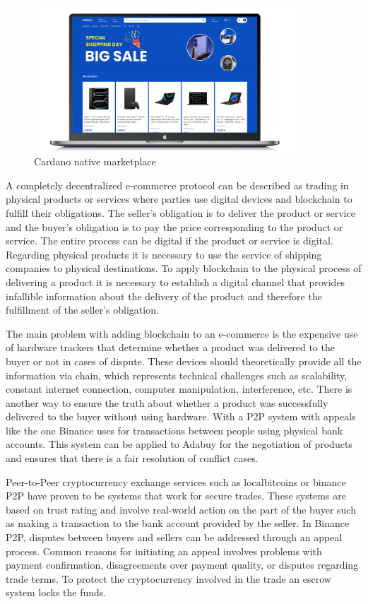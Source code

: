 \documentclass[12pt]{article}
\begin{document}
\begin{figure}[ht]
  \centering
  \includegraphics[width=0.88\textwidth, keepaspectratio]{adabuy.png}
  \caption{Cardano native marketplace}
  \label{fig:web}
\end{figure}

A completely decentralized e-commerce protocol can be described as trading in physical products or services where parties use digital devices and blockchain to fulfill their obligations.
The seller's obligation is to deliver the product or service and the buyer's obligation is to pay the price corresponding to the product or service. 
The entire process can be digital if the product or service is digital.
Regarding physical products it is necessary to use the service of shipping companies to physical destinations.
To apply blockchain to the physical process of delivering a product it is necessary to establish a digital channel that provides infallible information about the delivery of the product and therefore the fulfillment of the seller's obligation. 

The main problem with adding blockchain to an e-commerce is the expensive use of hardware trackers that determine whether a product was delivered to the buyer or not in cases of dispute. These devices should theoretically provide all the information via chain, which represents technical challenges such as scalability, constant internet connection, computer manipulation, interference, etc. There is another way to ensure the truth about whether a product was successfully delivered to the buyer without using hardware. With a P2P system with appeals like the one Binance uses for transactions between people using physical bank accounts. This system can be applied to Adabuy for the negotiation of products and ensures that there is a fair resolution of conflict cases.

Peer-to-Peer cryptocurrency exchange services such as localbitcoins or binance P2P have proven to be systems that work for secure trades. These systems are based on trust rating and involve real-world action on the part of the buyer such as making a transaction to the bank account provided by the seller. In Binance P2P, disputes between buyers and sellers can be addressed through an appeal process. Common reasons for initiating an appeal involves problems with payment confirmation, disagreements over payment quality, or disputes regarding trade terms. To protect the cryptocurrency involved in the trade an escrow system locks the funds.
\end{document}
